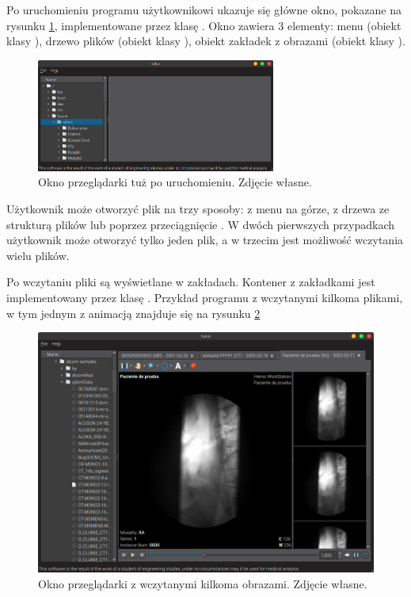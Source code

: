 \label{sec:sokar-gui}

\par
Po uruchomieniu programu użytkownikowi ukazuje się główne okno, pokazane na rysunku \ref{fig:sokar-gui-empty-window}, implementowane przez klasę .
Okno zawiera 3 elementy: menu (obiekt klasy ), drzewo plików (obiekt klasy ), obiekt zakładek z obrazami (obiekt klasy ).

\begin{figure}[!htbp]
    \centering
    \includegraphics[width=0.7\textwidth]{img/sokar-gui-001.png}
    \caption{Okno przeglądarki tuż po uruchomieniu. Zdjęcie własne.}
    \label{fig:sokar-gui-empty-window}
\end{figure}

\par
Użytkownik może otworzyć plik \DICOM na trzy sposoby: z menu na górze, z drzewa ze strukturą plików lub poprzez przeciągnięcie .
W dwóch pierwszych przypadkach użytkownik może otworzyć tylko jeden plik, a w trzecim jest możliwość wczytania wielu plików.

\par
Po wczytaniu pliki są wyświetlane w zakładach.
Kontener z zakładkami jest implementowany przez klasę .
Przykład programu z wczytanymi kilkoma plikami, w tym jednym z animacją znajduje się na rysunku \ref{fig:sokar-gui-with-files}

\begin{figure}[!htbp]
    \centering
    \includegraphics[width=\textwidth]{img/sokar-gui-002.png}
    \caption{Okno przeglądarki z wczytanymi kilkoma obrazami. Zdjęcie własne.}
    \label{fig:sokar-gui-with-files}
\end{figure}

